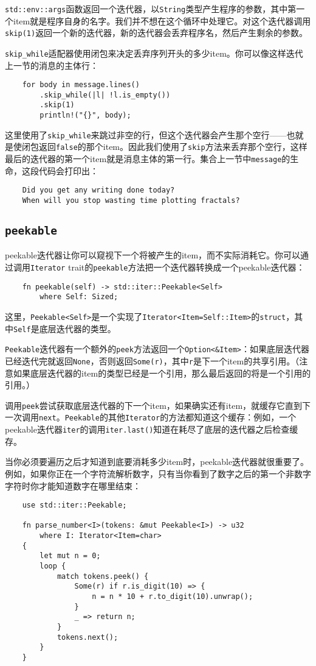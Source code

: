 \texttt{std::env::args}函数返回一个迭代器，以\texttt{String}类型产生程序的参数，其中第一个item就是程序自身的名字。我们并不想在这个循环中处理它。对这个迭代器调用\texttt{skip(1)}返回一个新的迭代器，新的迭代器会丢弃程序名，然后产生剩余的参数。

\texttt{skip\_while}适配器使用闭包来决定丢弃序列开头的多少item。你可以像这样迭代上一节的消息的主体行：
\begin{verbatim}
    for body in message.lines()
        .skip_while(|l| !l.is_empty())
        .skip(1)
        println!("{}", body);
\end{verbatim}

这里使用了\texttt{skip\_while}来跳过非空的行，但这个迭代器会产生那个空行——也就是使闭包返回\texttt{false}的那个item。因此我们使用了\texttt{skip}方法来丢弃那个空行，这样最后的迭代器的第一个item就是消息主体的第一行。集合上一节中\texttt{message}的生命，这段代码会打印出：
\begin{verbatim}
    Did you get any writing done today?
    When will you stop wasting time plotting fractals?
\end{verbatim}

\subsection{\texttt{peekable}}
peekable迭代器让你可以窥视下一个将被产生的item，而不实际消耗它。你可以通过调用\texttt{Iterator} trait的\texttt{peekable}方法把一个迭代器转换成一个peekable迭代器：
\begin{verbatim}
    fn peekable(self) -> std::iter::Peekable<Self>
        where Self: Sized;
\end{verbatim}
这里，\texttt{Peekable<Self>}是一个实现了\texttt{Iterator<Item=Self::Item>}的\texttt{struct}，其中\texttt{Self}是底层迭代器的类型。

\texttt{Peekable}迭代器有一个额外的\texttt{peek}方法返回一个\texttt{Option<\&Item>}：如果底层迭代器已经迭代完就返回\texttt{None}，否则返回\texttt{Some(r)}，其中\texttt{r}是下一个item的共享引用。（注意如果底层迭代器的item的类型已经是一个引用，那么最后返回的将是一个引用的引用。）

调用\texttt{peek}尝试获取底层迭代器的下一个item，如果确实还有item，就缓存它直到下一次调用\texttt{next}。\texttt{Peekable}的其他\texttt{Iterator}的方法都知道这个缓存：例如，一个peekable迭代器\texttt{iter}的调用\texttt{iter.last()}知道在耗尽了底层的迭代器之后检查缓存。

当你必须要遍历之后才知道到底要消耗多少item时，peekable迭代器就很重要了。例如，如果你正在一个字符流解析数字，只有当你看到了数字之后的第一个非数字字符时你才能知道数字在哪里结束：
\begin{verbatim}
    use std::iter::Peekable;

    fn parse_number<I>(tokens: &mut Peekable<I>) -> u32
        where I: Iterator<Item=char>
    {
        let mut n = 0;
        loop {
            match tokens.peek() {
                Some(r) if r.is_digit(10) => {
                    n = n * 10 + r.to_digit(10).unwrap();
                }
                _ => return n;
            }
            tokens.next();
        }
    }
\end{verbatim}

